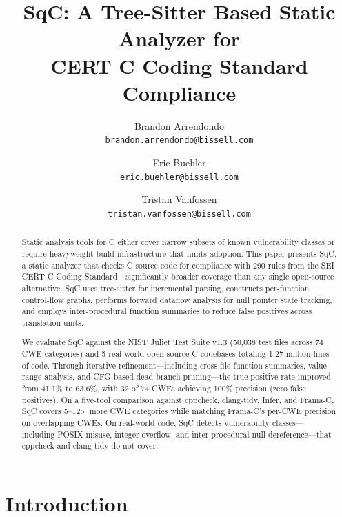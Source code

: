\documentclass[10pt,twocolumn,letterpaper]{article}
\begin{document}
\title{SqC: A Tree-Sitter Based Static Analyzer for\\CERT C Coding Standard Compliance}

\author{Brandon Arrendondo\\
{\tt\small brandon.arrendondo@bissell.com}
\and
Eric Buehler\\
{\tt\small eric.buehler@bissell.com}
\and
Tristan Vanfossen\\
{\tt\small tristan.vanfossen@bissell.com}
}
\maketitle

\begin{abstract}
Static analysis tools for C either cover narrow subsets of known
vulnerability classes or require heavyweight build infrastructure that
limits adoption.  This paper presents SqC, a static analyzer that
checks C source code for compliance with 290 rules from the SEI CERT C
Coding Standard---significantly broader coverage than any single
open-source alternative.  SqC uses tree-sitter for incremental parsing,
constructs per-function control-flow graphs, performs forward dataflow
analysis for null pointer state tracking, and employs inter-procedural
function summaries to reduce false positives across translation units.

We evaluate SqC against the NIST Juliet Test Suite v1.3 (50,038 test
files across 74 CWE categories) and 5 real-world open-source C codebases
totaling 1.27 million lines of code.  Through iterative
refinement---including cross-file function summaries, value-range analysis,
and CFG-based dead-branch pruning---the true positive rate improved from
41.1\% to 63.6\%, with 32 of 74 CWEs achieving 100\% precision (zero
false positives).  On a five-tool comparison against cppcheck, clang-tidy,
Infer, and Frama-C, SqC covers 5--12$\times$ more CWE categories while
matching Frama-C's per-CWE precision on overlapping CWEs.  On real-world code, SqC detects
vulnerability classes---including POSIX misuse, integer overflow, and
inter-procedural null dereference---that cppcheck and clang-tidy do not
cover.
\end{abstract}

\section{Introduction}
\label{sec:intro}
\end{document}
